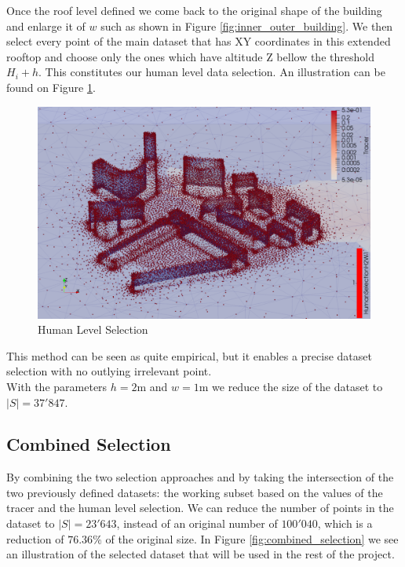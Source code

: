 Once the roof level defined we come back to the original shape of the building and enlarge it of $w$ such as shown in Figure \ref{fig:inner_outer_building}. We then select every point of the main dataset that has XY coordinates in this extended rooftop and choose only the ones which have altitude Z bellow the threshold $H_i + h$. This constitutes our human level data selection. An illustration can be found on Figure \ref{fig:human_selection}. \\

\begin{figure}[h!]
\centering
    \includegraphics[width = 0.8 \linewidth]{figures/Subset/HumanSelectionH2W1_zoom}
    \caption{Human Level Selection}
    \label{fig:human_selection}
\end{figure}

This method can be seen as quite empirical, but it enables a precise dataset selection with no outlying irrelevant point. \\

With the parameters $h = 2$m and $w = 1$m we reduce the size of the dataset to $|S| = 37'847$. 


\subsection{Combined Selection}

By combining the two selection approaches and by taking the intersection of the two previously defined datasets: the working subset based on the values of the tracer and the human level selection. We can reduce the number of points in the dataset to $|S| = 23'643$, instead of an original number of $100'040$, which is a reduction of $76.36\%$ of the original size. In Figure \ref{fig:combined_selection} we see an illustration of the selected dataset that will be used in the rest of the project. 

